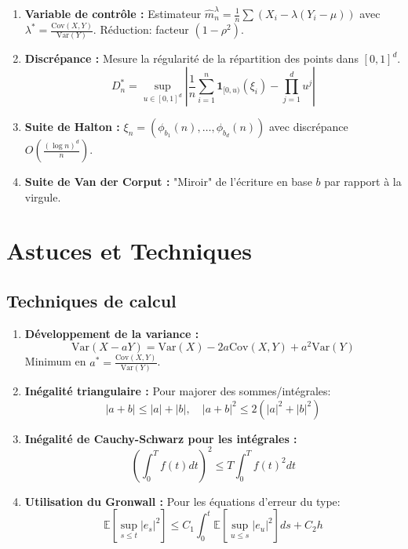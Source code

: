 \documentclass[12pt,a4paper]{article}
\theoremstyle{definition}
\newcommand{\E}{\mathbb{E}}
\newcommand{\Var}{\mathrm{Var}}
\newcommand{\Cov}{\mathrm{Cov}}
\newcommand{\ind}{\mathbf{1}}
\begin{document}
\begin{enumerate}
    \item \textbf{Variable de contrôle :} Estimateur $\hat{m}_n^{\lambda} = \frac{1}{n}\sum (X_i - \lambda(Y_i - \mu))$ avec $\lambda^* = \frac{\Cov(X,Y)}{\Var(Y)}$.
    Réduction: facteur $(1 - \rho^2)$.
    
    \item \textbf{Discrépance :} Mesure la régularité de la répartition des points dans $[0,1]^d$.
    \[
    D_n^* = \sup_{u \in [0,1]^d} \left| \frac{1}{n}\sum_{i=1}^n \ind_{[0,u)}(\xi_i) - \prod_{j=1}^d u^j \right|
    \]
    
    \item \textbf{Suite de Halton :} $\xi_n = (\phi_{b_1}(n), \ldots, \phi_{b_d}(n))$ avec discrépance $O\left(\frac{(\log n)^d}{n}\right)$.
    
    \item \textbf{Suite de Van der Corput :} "Miroir" de l'écriture en base $b$ par rapport à la virgule.
\end{enumerate}

\section{Astuces et Techniques}

\subsection{Techniques de calcul}

\begin{enumerate}
    \item \textbf{Développement de la variance :}
    \[
    \Var(X - aY) = \Var(X) - 2a\Cov(X,Y) + a^2\Var(Y)
    \]
    Minimum en $a^* = \frac{\Cov(X,Y)}{\Var(Y)}$.
    
    \item \textbf{Inégalité triangulaire :} Pour majorer des sommes/intégrales:
    \[
    |a + b| \leq |a| + |b|, \quad |a + b|^2 \leq 2(|a|^2 + |b|^2)
    \]
    
    \item \textbf{Inégalité de Cauchy-Schwarz pour les intégrales :}
    \[
    \left( \int_0^T f(t) dt \right)^2 \leq T \int_0^T f(t)^2 dt
    \]
    
    \item \textbf{Utilisation du Gronwall :} Pour les équations d'erreur du type:
    \[
    \E[\sup_{s \leq t} |e_s|^2] \leq C_1 \int_0^t \E[\sup_{u \leq s} |e_u|^2] ds + C_2 h
    \]
\end{enumerate}
\end{document}
